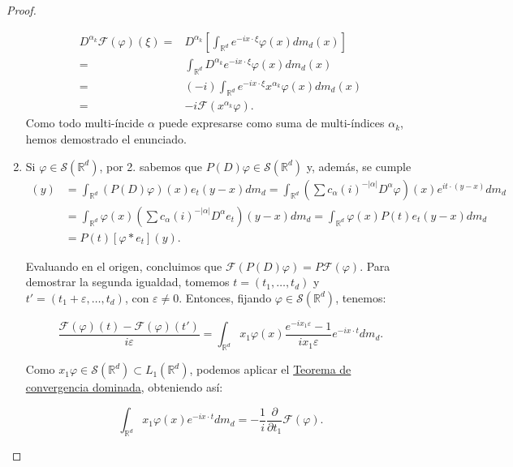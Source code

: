 \begin{proof}
\begin{enumerate}
\begin{align*}
D^{\alpha_{k}}\mathcal{F}(\varphi)(\xi) = & D^{\alpha_{k}} \left[ \int_{\mathds{R}^{d}} e^{-ix\cdot\xi} \varphi(x)dm_{d}(x)\right] \\
= & \int_{\mathds{R}^{d}} D^{\alpha_{k}} e^{-ix\cdot\xi} \varphi(x)dm_d(x) \\
= & (-i) \int_{\mathds{R}^{d}} e^{-ix\cdot\xi}x^{\alpha_k}\varphi(x)dm_d(x) \\
= & -i\mathcal{F}(x^{\alpha_k}\varphi).
\end{align*}
Como todo multi-íncide $\alpha$ puede expresarse como suma de multi-índices $\alpha_{k}$, hemos demostrado el enunciado. 
\item Si $\varphi\in\mathcal{S}(\mathds{R}^{d})$, por 2. sabemos que $P(D)\varphi\in \mathcal{S}(\mathds{R}^{d})$ y, además, se cumple 
\begin{align}
[(P(D)\varphi)*e_{t}](y) & = \int_{\mathds{R}^{d}} (P(D)\varphi)(x)e_{t}(y-x)dm_{d} = \int_{\mathds{R}^{d}} (\sum c_{\alpha} (i)^{-|\alpha |}D^{\alpha}\varphi)(x)e^{it\cdot (y-x)}dm_{d}\\  &= \int_{\mathds{R}^{d}} \varphi(x)(\sum c_{\alpha} (i)^{-|\alpha |}D^{\alpha}e_{t})(y-x)dm_{d} = 
\int_{\mathds{R}^{d}} \varphi(x)P(t)e_{t}(y-x)dm_{d} \\ & = P(t) [ \varphi*e_{t} ](y).
\end{align} 

Evaluando en el origen, concluimos que $\mathcal{F}(P(D)\varphi) = P \mathcal{F}(\varphi)$. Para demostrar la segunda igualdad, tomemos $t=(t_1,\ldots, t_d)$ y $t'=(t_1+\varepsilon,\ldots,t_d)$, con $\varepsilon\neq 0$. Entonces, fijando $\varphi\in \mathcal{S}(\mathds{R}^d)$, tenemos:

\begin{equation}
    \frac{\mathcal{F}(\varphi)(t)-\mathcal{F}(\varphi)(t')}{i\varepsilon} = \int_{\mathds{R}^d}x_1\varphi (x) \frac{e^{-ix_1\varepsilon}-1}{i x_1 \varepsilon}e^{-ix \cdot t}dm_d.
\end{equation}

Como $x_1 \varphi \in \mathcal{S}(\mathds{R}^d) \subset L_1(\mathds{R}^d)$, podemos aplicar el \hyperref[thm:h08]{Teorema de convergencia dominada}, obteniendo así:

\begin{equation}
 \int_{\mathds{R}^d} x_1 \varphi (x) e^{-i x\cdot t }dm_d =     - \frac{1}{i} \frac{\partial}{\partial t_1} \mathcal{F}(\varphi).
\end{equation}


\end{enumerate}
\end{proof}
